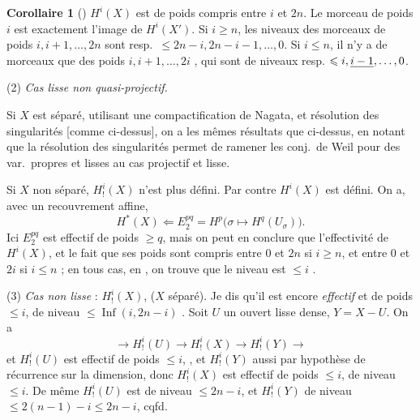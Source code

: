 \documentclass[11pt,a4paper]{article}
\begin{document}
\textbf{Corollaire 1} () $H^{i}(X)$ est de poids
compris entre $i$ et $2n$. Le morceau \struck{\ill{}} de poids $i$ est
exactement l'image de $H^{i}(X')$. Si $i \geqslant n$, les niveaux des morceaux
de poids $i, i+1, \ldots, 2n$ sont resp.\ $\leqslant 2n-i, 2n-i-1, \ldots, 0$.
Si $i \leqslant n$, il n'y a de morceaux que des poids $i, i+1, \ldots, 2i$
, qui sont de niveaux resp.
$\leqslant i, \uncertain{i-1}, \ldots, 0$.


(2) \emph{Cas \struck{\ill{}} lisse non quasi-projectif.}

Si $X$ est séparé, utilisant une compactification de Nagata, et résolution des
singularités [comme ci-dessus], on a les mêmes résultats que ci-dessus, en
notant que la résolution des singularités permet de ramener les conj.\ de Weil
pour des var.\ propres et lisses au cas projectif et lisse.

Si $X$ non séparé, $H^{i}_{!}(X)$ n'est plus défini. Par contre $H^{i}(X)$ est
défini. On a, avec un recouvrement affine,
\[
H^{*}(X) \Longleftarrow E_{2}^{pq} = H^{p}\bigl(\sigma \mapsto
H^{q}(U_{\sigma})\bigr) .
\]
Ici $E_{2}^{pq}$ est effectif de poids $\geqslant q$, mais
 \struck{\ill{}} on peut en conclure que l'effectivité de
$H^{i}(X)$, et le fait que ses poids sont compris entre 0 et $2n$ si
$i \geqslant n$, et entre 0 et $2i$ si $i \leqslant n$ ; en tous cas, en
\ill{}, on trouve que le niveau   est
$\leqslant i$ \struck{\ill{}}.

(3) \emph{Cas non lisse} : $H^{i}_{!}(X)$, ($X$ séparé). Je dis qu'il est encore
\emph{effectif} et de poids $\leqslant i$, de niveau
$\leqslant \operatorname{Inf}(i, 2n-i)$ .
Soit $U$ un ouvert lisse dense, $Y = X - U$. On a
\[
\to H^{i}_{!}(U) \to H^{i}_{!}(X) \to H^{i}_{!}(Y) \to
\]
et $H^{i}_{!}(U)$ est effectif de poids $\leqslant i$, , et $H^{i}_{!}(Y)$ aussi par
hypothèse de récurrence sur la dimension, donc $H^{i}_{!}(X)$ est effectif de
poids $\leqslant i$, de niveau $\leqslant i$. De même $H^{i}_{!}(U)$ est de
niveau $\leqslant 2n-i$, et $H^{i}_{!}(Y)$ de niveau
$\leqslant 2(n-1)-i \leqslant 2n-i$, cqfd.
\end{document}
